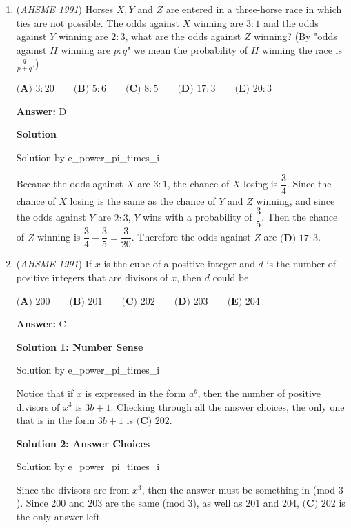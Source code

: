 \begin{enumerate}
	\item (\textit{AHSME 1991}) Horses $X,Y$ and $Z$ are entered in a three-horse race in which ties are not possible. The odds against $X$ winning are $3:1$ and the odds against $Y$ winning are $2:3$, what are the odds against $Z$ winning? (By "odds against $H$ winning are $p:q$" we mean the probability of $H$ winning the race is $\frac{q}{p+q}$.)


 $\textbf{(A) } 3:20\qquad \textbf{(B) } 5:6\qquad \textbf{(C) } 8:5\qquad \textbf{(D) } 17:3\qquad \textbf{(E) } 20:3$

 \textbf{Answer: }D



\textbf{Solution}

Solution by e\_power\_pi\_times\_i

 
Because the odds against $X$ are $3:1$, the chance of $X$ losing is $\dfrac{3}{4}$. Since the chance of $X$ losing is the same as the chance of $Y$ and $Z$ winning, and since the odds against $Y$ are $2:3$, $Y$ wins with a probability of $\dfrac{3}{5}$. Then the chance of $Z$ winning is $\dfrac{3}{4} - \dfrac{3}{5} = \dfrac{3}{20}$. Therefore the odds against $Z$ are $\boxed{\textbf{(D) } 17:3}$.

 


	\item (\textit{AHSME 1991}) If $x$ is the cube of a positive integer and $d$ is the number of positive integers that are divisors of $x$, then $d$ could be


 $\textbf{(A) } 200\qquad \textbf{(B) } 201\qquad \textbf{(C) } 202\qquad \textbf{(D) } 203\qquad \textbf{(E) } 204$

 \textbf{Answer: }C



\textbf{Solution 1: Number Sense}

Solution by e\_power\_pi\_times\_i

 
Notice that if $x$ is expressed in the form $a^b$, then the number of positive divisors of $x^3$ is $3b+1$. Checking through all the answer choices, the only one that is in the form $3b+1$ is $\boxed{\textbf{(C) } 202}$.

 



\textbf{Solution 2: Answer Choices}

Solution by e\_power\_pi\_times\_i

 
Since the divisors are from $x^3$, then the answer must be something in (mod $3$). Since $200$ and $203$ are the same (mod $3$), as well as $201$ and $204$, $\boxed{\textbf{(C) } 202}$ is the only answer left.


\end{enumerate}
